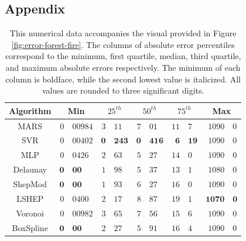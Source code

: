 \documentclass[smallextended,final]{svjour3}  %
\begin{document}
\begin{appendix}
\section*{Appendix}
\label{sec:appendix}

\vspace*{\fill}

\begin{table}[H]
  \centering
  \begin{tabular}{c|r@{.}l|r@{.}l|r@{.}l|r@{.}l|r@{.}l}
    \hline
    Algorithm & \multicolumn{2}{c|}{Min} & \multicolumn{2}{c|}{$25^{th}$} & \multicolumn{2}{c|}{$50^{th}$} & \multicolumn{2}{c|}{$75^{th}$} & \multicolumn{2}{c}{Max}\\
    \hline
    MARS & $0$&$00984$ & $3$&$11$ & $7$&$01$ & $\mathit{11}$&$\mathit{7}$ & $1090$&$0$\\
    SVR & $\mathit{0}$&$\mathit{00402}$ & $\mathbf{0}$&$\mathbf{243}$ & $\mathbf{0}$&$\mathbf{416}$ & $\mathbf{6}$&$\mathbf{19}$ & $1090$&$0$\\
    MLP & $0$&$0426$ & $2$&$63$ & $\mathit{5}$&$\mathit{27}$ & $14$&$0$ & $1090$&$0$\\
    Delaunay & $\mathbf{0}$&$\mathbf{00}$ & $1$&$98$ & $5$&$37$ & $13$&$1$ & $\mathit{1080}$&$\mathit{0}$\\
    ShepMod & $\mathbf{0}$&$\mathbf{00}$ & $\mathit{1}$&$\mathit{93}$ & $6$&$27$ & $16$&$0$ & $1090$&$0$\\
    LSHEP & $0$&$0400$ & $2$&$17$ & $8$&$87$ & $19$&$1$ & $\mathbf{1070}$&$\mathbf{0}$\\
    Voronoi & $0$&$00982$ & $3$&$65$ & $7$&$56$ & $15$&$6$ & $1090$&$0$\\
    BoxSpline & $\mathbf{0}$&$\mathbf{00}$ & $2$&$27$ & $5$&$91$ & $16$&$4$ & $1090$&$0$\\
    \hline
  \end{tabular}
  \caption{This numerical data accompanies the visual provided in
    Figure \ref{fig:error-forest-fire}. The columns of absolute error
    percentiles correspond to the minimum, first quartile, median,
    third quartile, and maximum absolute errors respectively. The
    minimum of each column is boldface, while the second lowest value
    is italicized. All values are rounded to three significant
    digits.}
  \label{table:error-forest-fire}
\end{table}


\end{appendix}
\end{document}
